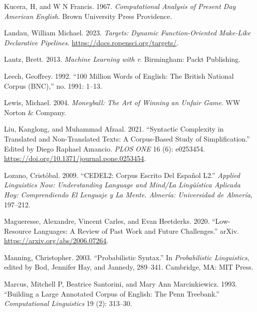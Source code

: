 \documentclass[
  letterpaper,
  DIV=11,
  numbers=noendperiod]{scrreport}
\newlength{\cslhangindent}
\newlength{\cslentryspacingunit} %
\newenvironment{CSLReferences}[2] %
 {%
  \setlength{\parindent}{0pt}
  \ifodd #1
  \let\oldpar\par
  \def\par{\hangindent=\cslhangindent\oldpar}
  \fi
  \setlength{\parskip}{#2\cslentryspacingunit}
 }%
 {}
\theoremstyle{definition}
\theoremstyle{remark}
\begin{document}
\begin{CSLReferences}{1}{0}
\leavevmode{}%
Kucera, H, and W N Francis. 1967. \emph{Computational Analysis of
Present Day American English}. Brown University Press Providence.

\leavevmode{}%
Landau, William Michael. 2023. \emph{Targets: Dynamic Function-Oriented
Make-Like Declarative Pipelines}.
\url{https://docs.ropensci.org/targets/}.

\leavevmode{}%
Lantz, Brett. 2013. \emph{Machine Learning with r}. Birmingham: Packt
Publishing.

\leavevmode{}%
Leech, Geoffrey. 1992. {``100 Million Words of English: The British
National Corpus (BNC),''} no. 1991: 1--13.

\leavevmode{}%
Lewis, Michael. 2004. \emph{Moneyball: The Art of Winning an Unfair
Game}. WW Norton \& Company.

\leavevmode{}%
Liu, Kanglong, and Muhammad Afzaal. 2021. {``Syntactic Complexity in
Translated and Non-Translated Texts: A Corpus-Based Study of
Simplification.''} Edited by Diego Raphael Amancio. \emph{PLOS ONE} 16
(6): e0253454. \url{https://doi.org/10.1371/journal.pone.0253454}.

\leavevmode{}%
Lozano, Cristóbal. 2009. {``CEDEL2: Corpus Escrito Del Español L2.''}
\emph{Applied Linguistics Now: Understanding Language and Mind/La
Lingüística Aplicada Hoy: Comprendiendo El Lenguaje y La Mente. Almería:
Universidad de Almería}, 197--212.

\leavevmode{}%
Magueresse, Alexandre, Vincent Carles, and Evan Heetderks. 2020.
{``Low-Resource Languages: A Review of Past Work and Future
Challenges.''} arXiv. \url{https://arxiv.org/abs/2006.07264}.

\leavevmode{}%
Manning, Christopher. 2003. {``Probabilistic Syntax.''} In
\emph{Probabilistic Linguistics}, edited by Bod, Jennifer Hay, and
Jannedy, 289--341. Cambridge, MA: MIT Press.

\leavevmode{}%
Marcus, Mitchell P, Beatrice Santorini, and Mary Ann Marcinkiewicz.
1993. {``Building a Large Annotated Corpus of English: The Penn
Treebank.''} \emph{Computational Linguistics} 19 (2): 313--30.


\end{CSLReferences}
\end{document}
